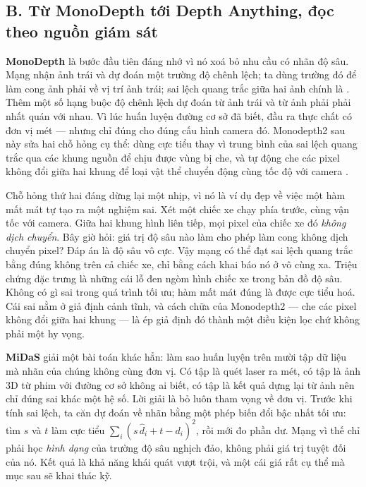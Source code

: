 \documentclass[../../deep_learning.tex]{subfiles}
\begin{document}
\subsection{B. Từ MonoDepth tới Depth Anything, đọc theo nguồn giám sát}
\textbf{MonoDepth} \cite{godard2017monodepth} là bước đầu tiên đáng nhớ vì nó xoá bỏ nhu cầu có nhãn độ sâu. Mạng nhận ảnh trái và dự đoán một trường độ chênh lệch; ta dùng trường đó để làm cong ảnh phải về vị trí ảnh trái; sai lệch quang trắc giữa hai ảnh chính là . Thêm một số hạng buộc độ chênh lệch dự đoán từ ảnh trái và từ ảnh phải phải nhất quán với nhau. Vì lúc huấn luyện đường cơ sở đã biết, đầu ra thực chất có đơn vị mét --- nhưng chỉ đúng cho đúng cấu hình camera đó. Monodepth2 sau này sửa hai chỗ hỏng cụ thể: dùng cực tiểu thay vì trung bình của sai lệch quang trắc qua các khung nguồn để chịu được vùng bị che, và tự động che các pixel không đổi giữa hai khung để loại vật thể chuyển động cùng tốc độ với camera \cite{godard2019monodepth2}.

Chỗ hỏng thứ hai đáng dừng lại một nhịp, vì nó là ví dụ đẹp về việc một hàm mất mát tự tạo ra một nghiệm sai. Xét một chiếc xe chạy phía trước, cùng vận tốc với camera. Giữa hai khung hình liên tiếp, mọi pixel của chiếc xe đó \emph{không dịch chuyển}. Bây giờ hỏi: giá trị độ sâu nào làm cho phép làm cong không dịch chuyển pixel? Đáp án là độ sâu vô cực. Vậy mạng có thể đạt sai lệch quang trắc bằng đúng không trên cả chiếc xe, chỉ bằng cách khai báo nó ở vô cùng xa. Triệu chứng đặc trưng là những cái lỗ đen ngòm hình chiếc xe trong bản đồ độ sâu. Không có gì sai trong quá trình tối ưu; hàm mất mát đúng là được cực tiểu hoá. Cái sai nằm ở giả định cảnh tĩnh, và cách chữa của Monodepth2 --- che các pixel không đổi giữa hai khung --- là ép giả định đó thành một điều kiện lọc chứ không phải một hy vọng.

\textbf{MiDaS} \cite{ranftl2022midas} giải một bài toán khác hẳn: làm sao huấn luyện trên mười tập dữ liệu mà nhãn của chúng không cùng đơn vị. Có tập là quét laser ra mét, có tập là ảnh 3D từ phim với đường cơ sở không ai biết, có tập là kết quả dựng lại từ ảnh nên chỉ đúng sai khác một hệ số. Lời giải là bỏ luôn tham vọng về đơn vị. Trước khi tính sai lệch, ta căn dự đoán về nhãn bằng một phép biến đổi bậc nhất tối ưu: tìm \(s\) và \(t\) làm cực tiểu \(\sum_i (s\,\hat{d}_i + t - d_i)^2\), rồi mới đo phần dư. Mạng vì thế chỉ phải học \emph{hình dạng} của trường độ sâu nghịch đảo, không phải giá trị tuyệt đối của nó. Kết quả là khả năng khái quát vượt trội, và một cái giá rất cụ thể mà mục sau sẽ khai thác kỹ.
\end{document}
